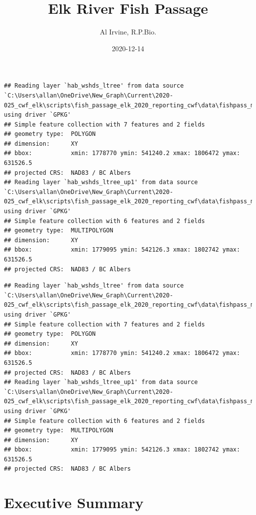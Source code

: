 \documentclass[
]{book}
\title{Elk River Fish Passage}
\author{Al Irvine, R.P.Bio.}
\date{2020-12-14}
\begin{document}
\maketitle

{
\setcounter{tocdepth}{1}
\tableofcontents
}
\begin{verbatim}
## Reading layer `hab_wshds_ltree' from data source `C:\Users\allan\OneDrive\New_Graph\Current\2020-025_cwf_elk\scripts\fish_passage_elk_2020_reporting_cwf\data\fishpass_mapping.gpkg' using driver `GPKG'
## Simple feature collection with 7 features and 2 fields
## geometry type:  POLYGON
## dimension:      XY
## bbox:           xmin: 1778770 ymin: 541240.2 xmax: 1806472 ymax: 631526.5
## projected CRS:  NAD83 / BC Albers
## Reading layer `hab_wshds_ltree_up1' from data source `C:\Users\allan\OneDrive\New_Graph\Current\2020-025_cwf_elk\scripts\fish_passage_elk_2020_reporting_cwf\data\fishpass_mapping.gpkg' using driver `GPKG'
## Simple feature collection with 6 features and 2 fields
## geometry type:  MULTIPOLYGON
## dimension:      XY
## bbox:           xmin: 1779095 ymin: 542126.3 xmax: 1802742 ymax: 631526.5
## projected CRS:  NAD83 / BC Albers
\end{verbatim}

\begin{verbatim}
## Reading layer `hab_wshds_ltree' from data source `C:\Users\allan\OneDrive\New_Graph\Current\2020-025_cwf_elk\scripts\fish_passage_elk_2020_reporting_cwf\data\fishpass_mapping.gpkg' using driver `GPKG'
## Simple feature collection with 7 features and 2 fields
## geometry type:  POLYGON
## dimension:      XY
## bbox:           xmin: 1778770 ymin: 541240.2 xmax: 1806472 ymax: 631526.5
## projected CRS:  NAD83 / BC Albers
## Reading layer `hab_wshds_ltree_up1' from data source `C:\Users\allan\OneDrive\New_Graph\Current\2020-025_cwf_elk\scripts\fish_passage_elk_2020_reporting_cwf\data\fishpass_mapping.gpkg' using driver `GPKG'
## Simple feature collection with 6 features and 2 fields
## geometry type:  MULTIPOLYGON
## dimension:      XY
## bbox:           xmin: 1779095 ymin: 542126.3 xmax: 1802742 ymax: 631526.5
## projected CRS:  NAD83 / BC Albers
\end{verbatim}

\hypertarget{executive-summary}{%
\chapter*{Executive Summary}\label{executive-summary}}
\end{document}
